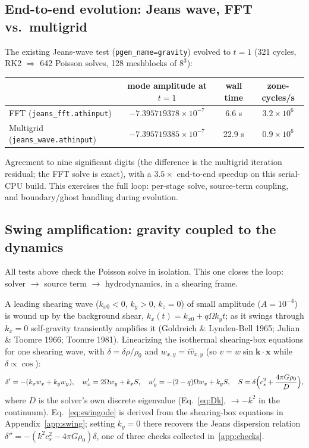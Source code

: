 \documentclass[11pt]{article}
\newcommand{\code}[1]{\texttt{#1}}
\begin{document}
\subsection{End-to-end evolution: Jeans wave, FFT vs.\ multigrid}
The existing Jeans-wave test (\code{pgen\_name=gravity}) evolved to $t=1$
(321 cycles, RK2 $\Rightarrow$ 642 Poisson solves, 128 meshblocks of $8^3$):
\begin{center}
\begin{tabular}{@{}lccc@{}}
\toprule
 & mode amplitude at $t{=}1$ & wall time & zone-cycles/s \\
\midrule
FFT (\code{jeans\_fft.athinput}) & $-7.395719378\times10^{-7}$ & 6.6 s & $3.2\times10^6$ \\
Multigrid (\code{jeans\_wave.athinput}) & $-7.395719385\times10^{-7}$ & 22.9 s & $0.9\times10^6$ \\
\bottomrule
\end{tabular}
\end{center}
Agreement to nine significant digits (the difference is the multigrid iteration
residual; the FFT solve is exact), with a $3.5\times$ end-to-end speedup on this
serial-CPU build. This exercises the full loop: per-stage solve, source-term
coupling, and boundary/ghost handling during evolution.

\subsection{Swing amplification: gravity coupled to the dynamics}
\label{sec:swing}
All tests above check the Poisson solve in isolation. This one closes the loop:
solver $\to$ source term $\to$ hydrodynamics, in a shearing frame.

A leading shearing wave ($k_{x0}<0$, $k_y>0$, $k_z=0$) of small amplitude
($A=10^{-4}$) is wound up by the background shear, $k_x(t)=k_{x0}+q\Omega k_y t$;
as it swings through $k_x=0$ self-gravity transiently amplifies it (Goldreich \&
Lynden-Bell 1965; Julian \& Toomre 1966; Toomre 1981). Linearizing the isothermal
shearing-box equations for one shearing wave, with
$\delta=\delta\rho/\rho_0$ and $w_{x,y}=i\hat v_{x,y}$ (so
$v = w\sin\mathbf{k}\!\cdot\!\mathbf{x}$ while $\delta\propto\cos$):
\begin{equation}
  \delta' = -(k_x w_x + k_y w_y),\quad
  w_x' = 2\Omega w_y + k_x S,\quad
  w_y' = -(2-q)\Omega w_x + k_y S,\quad
  S = \delta\Bigl(c_s^2 + \frac{4\pi G\rho_0}{D}\Bigr),
  \label{eq:swingode}
\end{equation}
where $D$ is the solver's own discrete eigenvalue (Eq.~\ref{eq:Dk}, $\to-k^2$ in the
continuum). Eq.~\eqref{eq:swingode} is derived from the shearing-box equations in
Appendix~\ref{app:swing}; setting $k_y=0$ there recovers the Jeans dispersion relation
$\delta''=-(k^2c_s^2-4\pi G\rho_0)\delta$, one of three checks collected
in~\ref{app:checks}.
\end{document}
